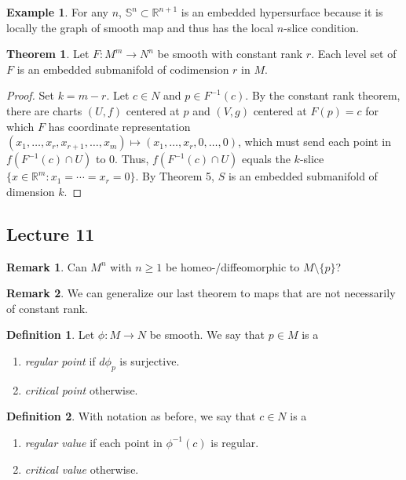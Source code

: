 \documentclass[10pt,letterpaper,cm]{nupset}
\theoremstyle{definition}
\newtheorem*{definition}{Definition}
\newtheorem{exmp}{Example}
\newtheorem{remark}{Remark}
\newtheorem{theorem}{Theorem}
\newcommand{\R}{\mathbb R}
\renewcommand{\S}{\mathbb S}
\newcommand{\1}{\mathbf{1}}
\newcommand{\0}{\vec 0}
\begin{document}
\begin{exmp}
For any $n$, $\S^n \subset \R^{n+1}$ is an embedded hypersurface because it is locally the graph of smooth map and thus has the local $n$-slice condition.
\end{exmp}

\begin{theorem}
Let $F: M^m \to N^n$ be smooth with constant rank $r$. Each level set of $F$ is an embedded submanifold of codimension $r$ in $M$.
\end{theorem}
\begin{proof}
Set $k = m -r$. Let $c \in N$ and $p \in F^{-1}(c)$. By the constant rank theorem, there are charts $(U, f)$ centered at $p$ and $(V, g)$ centered at $F(p) = c$ for which $F$ has coordinate representation $(x_1, \ldots, x_r, x_{r+1}, \ldots, x_m) \mapsto (x_1, \ldots, x_r, 0, \ldots, 0)$, which must send each point in $f(F^{-1}(c) \cap U)$ to $0$.  Thus, $f(F^{-1}(c) \cap U)$ equals the $k$-slice $\{x \in \R^m : x_1 = \cdots = x_r = 0\}$. By Theorem 5, $S$ is an embedded submanifold of dimension $k$.
\end{proof}

\subsection{Lecture 11}

\begin{remark}
Can $M^n$ with $n\geq 1$ be homeo-/diffeomorphic to $M\setminus \{p\}$? 
\end{remark}

\begin{remark}
We can generalize our last theorem to maps that are not necessarily of constant rank.
\end{remark}

\begin{definition}
Let $\phi : M \to N$ be smooth. We say that $p\in M$ is a
\begin{enumerate}
\item \textit{regular point} if $d\phi_p$ is surjective.
\item  \textit{critical point} otherwise.
\end{enumerate}
\end{definition}

\begin{definition}
With notation as before, we say that $c \in N$ is a
\begin{enumerate}
\item  \textit{regular value} if each point in $\phi^{-1}(c)$ is regular.
\item  \textit{critical value} otherwise.
\end{enumerate}
\end{definition}
\end{document}
